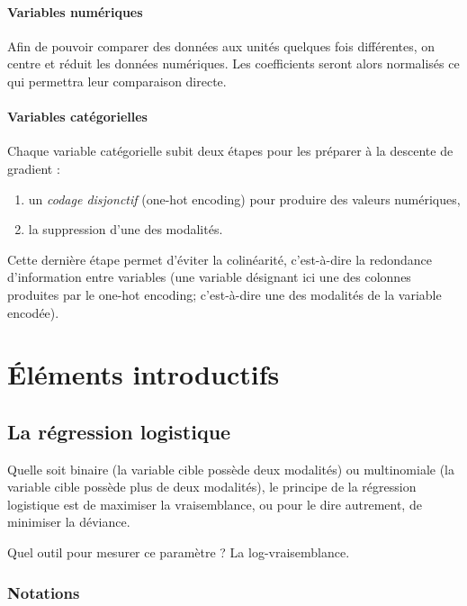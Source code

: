 \documentclass[10pt,french]{report}
\begin{document}
	\subsubsection{Variables numériques}

	Afin de pouvoir comparer des données aux unités quelques fois différentes, on centre et réduit les données numériques. Les coefficients seront alors normalisés ce qui permettra leur comparaison directe.

	\subsubsection{Variables catégorielles}

	Chaque variable catégorielle subit deux étapes pour les préparer à la descente de gradient :

	\begin{enumerate}
		\item un \textit{codage disjonctif} (one-hot encoding) pour produire des valeurs numériques,
		\item la suppression d'une des modalités.
	\end{enumerate}

	Cette dernière étape permet d'éviter la colinéarité, c'est-à-dire la redondance d'information entre variables (une variable désignant ici une des colonnes produites par le one-hot encoding; c'est-à-dire une des modalités de la variable encodée).

	\chapter{Éléments introductifs}

	\section{La régression logistique}

	Quelle soit binaire (la variable cible possède deux modalités) ou multinomiale (la variable cible possède plus de deux modalités), le principe de la régression logistique est de maximiser la vraisemblance, ou pour le dire autrement, de minimiser la déviance.

	Quel outil pour mesurer ce paramètre ? La log-vraisemblance.

    \subsection{Notations}
\end{document}

